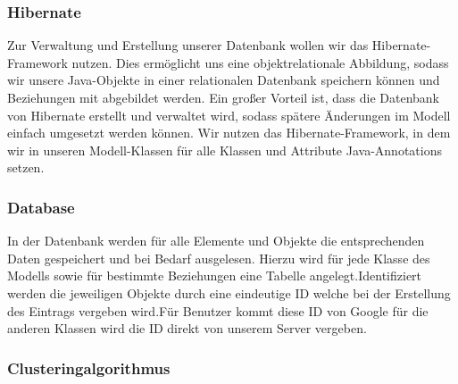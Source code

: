 \begin {center}
\end {center}


	\subsubsection{Hibernate}
	Zur Verwaltung und Erstellung unserer Datenbank wollen wir das Hibernate-Framework nutzen. 
	Dies ermöglicht uns eine objektrelationale Abbildung, sodass wir unsere Java-Objekte in einer relationalen Datenbank speichern können und Beziehungen mit abgebildet werden.
	Ein großer Vorteil ist, dass die Datenbank von Hibernate erstellt und verwaltet wird, sodass spätere Änderungen im Modell einfach umgesetzt werden können.
	Wir nutzen das Hibernate-Framework, in dem wir in unseren Modell-Klassen für alle Klassen und Attribute Java-Annotations setzen.
	
	\subsubsection{Database}
	In der Datenbank werden für alle Elemente und Objekte die entsprechenden Daten gespeichert und bei Bedarf ausgelesen. Hierzu wird für jede Klasse des Modells sowie für bestimmte Beziehungen eine Tabelle angelegt.Identifiziert werden die jeweiligen Objekte durch eine eindeutige ID welche bei der Erstellung des Eintrags vergeben wird.Für Benutzer kommt diese ID von Google für die anderen Klassen wird die ID direkt von unserem Server vergeben.
	
\subsubsection{Clusteringalgorithmus}


